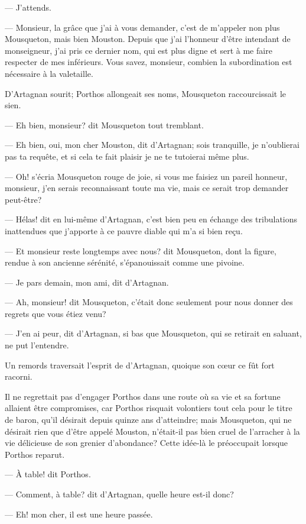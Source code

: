 — J'attends.

— Monsieur, la grâce que j'ai à vous demander, c'est de m'appeler non plus Mousqueton, mais bien Mouston. Depuis que j'ai l'honneur d'être intendant de monseigneur, j'ai pris ce dernier nom, qui est plus digne et sert à me faire respecter de mes inférieurs. Vous savez, monsieur, combien la subordination est nécessaire à la valetaille.

D'Artagnan sourit; Porthos allongeait ses noms, Mousqueton raccourcissait le sien.

— Eh bien, monsieur? dit Mousqueton tout tremblant.

— Eh bien, oui, mon cher Mouston, dit d'Artagnan; sois tranquille, je n'oublierai pas ta requête, et si cela te fait plaisir je ne te tutoierai même plus.

— Oh! s'écria Mousqueton rouge de joie, si vous me faisiez un pareil honneur, monsieur, j'en serais reconnaissant toute ma vie, mais ce serait trop demander peut-être?

— Hélas! dit en lui-même d'Artagnan, c'est bien peu en échange des tribulations inattendues que j'apporte à ce pauvre diable qui m'a si bien reçu.

— Et monsieur reste longtemps avec nous? dit Mousqueton, dont la figure, rendue à son ancienne sérénité, s'épanouissait comme une pivoine.

— Je pars demain, mon ami, dit d'Artagnan.

— Ah, monsieur! dit Mousqueton, c'était donc seulement pour nous donner des regrets que vous étiez venu?

— J'en ai peur, dit d'Artagnan, si bas que Mousqueton, qui se retirait en saluant, ne put l'entendre.

Un remords traversait l'esprit de d'Artagnan, quoique son cœur ce fût fort racorni.

Il ne regrettait pas d'engager Porthos dans une route où sa vie et sa fortune allaient être compromises, car Porthos risquait volontiers tout cela pour le titre de baron, qu'il désirait depuis quinze ans d'atteindre; mais Mousqueton, qui ne désirait rien que d'être appelé Mouston, n'était-il pas bien cruel de l'arracher à la vie délicieuse de son grenier d'abondance? Cette idée-là le préoccupait lorsque Porthos reparut.

— À table! dit Porthos.

— Comment, à table? dit d'Artagnan, quelle heure est-il donc?

— Eh! mon cher, il est une heure passée.

